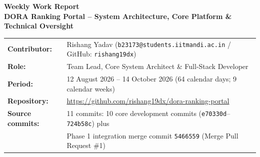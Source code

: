 \documentclass[11pt,a4paper]{article}
\begin{document}
{\Large\bfseries Weekly Work Report}\\[4pt]
{\large\bfseries\color{primary} DORA Ranking Portal -- System Architecture, Core Platform \& Technical Oversight}\\[6pt]
\begin{tabular}{@{}ll@{}}
\textbf{Contributor:} & Rishang Yadav (\texttt{b23173@students.iitmandi.ac.in} / GitHub: \texttt{rishang19dx}) \\
\textbf{Role:} & Team Lead, Core System Architect \& Full-Stack Developer \\
\textbf{Period:} & 12 August 2026 -- 14 October 2026 (64 calendar days; 9 calendar weeks) \\
\textbf{Repository:} & \url{https://github.com/rishang19dx/dora-ranking-portal} \\
\textbf{Source commits:} & 11 commits: 10 core development commits (\texttt{e70330d}--\texttt{724b58c}) plus \\
& Phase 1 integration merge commit \texttt{5466559} (Merge Pull Request \#1)
\end{tabular}

\vspace{0.4cm}
\end{document}
